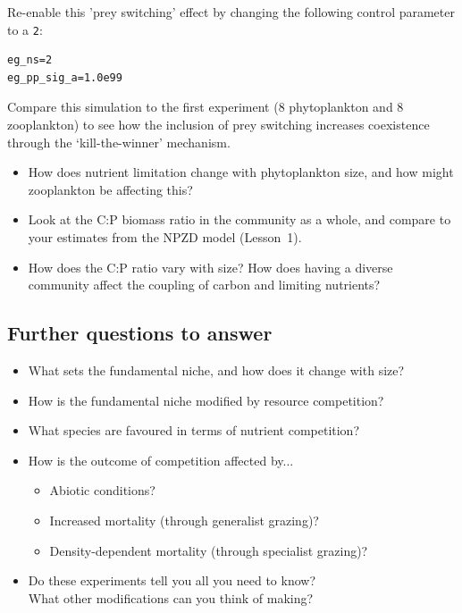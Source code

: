 \documentclass[11pt,fleqn]{book} %
\begin{document}
Re-enable this 'prey switching' effect by changing the following control parameter to a \texttt{2}:
\small\begin{verbatim}
eg_ns=2
eg_pp_sig_a=1.0e99
\end{verbatim}\normalsize
Compare this simulation to the first experiment (8 phytoplankton and 8 zooplankton) to see how the inclusion of prey switching increases coexistence through the `kill-the-winner' mechanism.
\begin{itemize}
\item How does nutrient limitation change with phytoplankton size, and how might zooplankton be affecting this?
\item Look at the C:P biomass ratio in the community as a whole, and compare to your estimates from the NPZD model (Lesson~1). 
\item How does the C:P ratio vary with size? How does having a diverse community affect the coupling of carbon and limiting nutrients?
\end{itemize}


\subsection*{Further questions to answer} 

\begin{itemize}
\item What sets the fundamental niche, and how does it change with size?
\item How is the fundamental niche modified by resource competition?
\item What species are favoured in terms of nutrient competition?
\item How is the outcome of competition affected by...
\begin{itemize}
\item Abiotic conditions?
\item Increased mortality (through generalist grazing)?
\item Density-dependent mortality (through specialist grazing)?
\end{itemize}
\item Do these experiments tell you all you need to know?\\What other modifications can you think of making?
\end{itemize}

\end{document}
